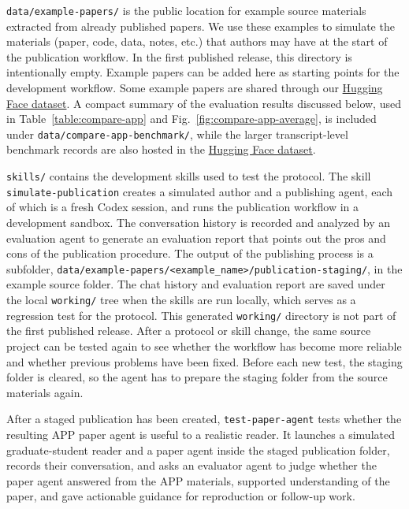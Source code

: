 \documentclass{article}
\begin{document}
\texttt{data/example-papers/} is the public location for example source materials extracted from already published papers. We use these examples to simulate the materials (paper, code, data, notes, etc.) that authors may have at the start of the publication workflow. In the first published release, this directory is intentionally empty. Example papers can be added here as starting points for the development workflow. Some example papers are shared through our \href{https://huggingface.co/datasets/phynics/agentic-publication-protocol-dataset}{Hugging Face dataset}. A compact summary of the evaluation results discussed below, used in Table~\ref{table:compare-app} and Fig.~\ref{fig:compare-app-average}, is included under \texttt{data/compare-app-benchmark/}, while the larger transcript-level benchmark records are also hosted in the \href{https://huggingface.co/datasets/phynics/agentic-publication-protocol-dataset}{Hugging Face dataset}.

\texttt{skills/} contains the development skills used to test the protocol. The skill \texttt{simulate-publication} creates a simulated author and a publishing agent, each of which is a fresh Codex session, and runs the publication workflow in a development sandbox. The conversation history is recorded and analyzed by an evaluation agent to generate an evaluation report that points out the pros and cons of the publication procedure. The output of the publishing process is a subfolder, \texttt{data/example-papers/<example\_name>/publication-staging/}, in the example source folder. The chat history and evaluation report are saved under the local \texttt{working/} tree when the skills are run locally, which serves as a regression test for the protocol. This generated \texttt{working/} directory is not part of the first published release. After a protocol or skill change, the same source project can be tested again to see whether the workflow has become more reliable and whether previous problems have been fixed. Before each new test, the staging folder is cleared, so the agent has to prepare the staging folder from the source materials again.

After a staged publication has been created, \texttt{test-paper-agent} tests whether the resulting APP paper agent is useful to a realistic reader. It launches a simulated graduate-student reader and a paper agent inside the staged publication folder, records their conversation, and asks an evaluator agent to judge whether the paper agent answered from the APP materials, supported understanding of the paper, and gave actionable guidance for reproduction or follow-up work.
\end{document}
